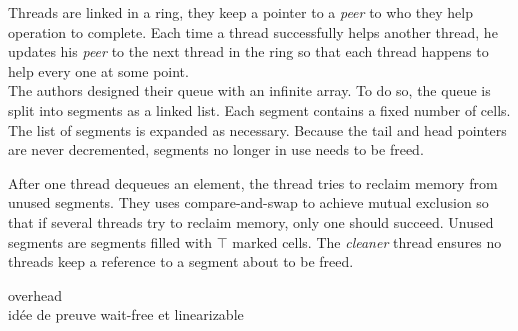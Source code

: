 Threads are linked in a ring, they keep a pointer to a \textit{peer} to who they
help operation to complete. Each time a thread successfully helps another
thread, he updates his \textit{peer} to the next thread in the ring so that each
thread happens to help every one at some point. \\

 The authors designed their queue with an infinite
array. To do so, the queue is split into segments as a linked list. Each segment
contains a fixed number of cells. The list of segments is expanded as necessary.
Because the tail and head pointers are never decremented, segments no longer in
use needs to be freed.

After one thread dequeues an element, the thread tries to reclaim memory from
unused segments. They uses compare-and-swap to achieve mutual exclusion so that
if several threads try to reclaim memory, only one should succeed. Unused
segments are segments filled with $\top$ marked cells. The \textit{cleaner}
thread ensures no threads keep a reference to a segment about to be freed.

overhead \\

idée de preuve wait-free et linearizable

